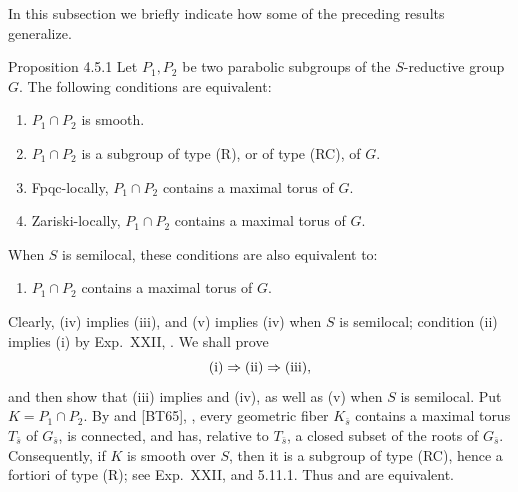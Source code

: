 
In this subsection we briefly indicate how some of the preceding
results generalize.

\begin{sgastatement}{Proposition 4.5.1}
Let \(P_1,P_2\) be two parabolic subgroups of the \(S\)-reductive
group \(G\).  The following conditions are equivalent:
\begin{enumerate}[label=\textup{(\roman*)}]
\item \(P_1\cap P_2\) is smooth.
\item \(P_1\cap P_2\) is a subgroup of type \textup{(R)}, or of type
\textup{(RC)}, of \(G\).
\item Fpqc-locally, \(P_1\cap P_2\) contains a maximal torus of \(G\).
\item Zariski-locally, \(P_1\cap P_2\) contains a maximal torus of
\(G\).
\end{enumerate}
When \(S\) is semilocal, these conditions are also equivalent to:
\begin{enumerate}[label=\textup{(\roman*)},start=5]
\item \(P_1\cap P_2\) contains a maximal torus of \(G\).
\end{enumerate}
\end{sgastatement}

\SGAProof
Clearly, \textup{(iv)} implies \textup{(iii)}, and \textup{(v)}
implies \textup{(iv)} when \(S\) is semilocal; condition \textup{(ii)}
implies \textup{(i)} by Exp.\ XXII, .  We shall prove
\[
 \textup{(i)}\Rightarrow\textup{(ii)}
 \Rightarrow\textup{(iii)},
\]
and then show that \textup{(iii)} implies \textup{} and
\textup{(iv)}, as well as \textup{(v)} when \(S\) is semilocal.
Put \(K=P_1\cap P_2\).  By  and \textup{[BT65]}, , every
geometric fiber \(K_{\bar s}\) contains a maximal torus
\(T_{\bar s}\) of \(G_{\bar s}\), is connected, and has, relative to
\(T_{\bar s}\), a closed subset of the roots of \(G_{\bar s}\).
Consequently, if \(K\) is smooth over \(S\), then it is a subgroup of
type \textup{(RC)}, hence a fortiori of type \textup{(R)}; see Exp.\
XXII,  and 5.11.1.  Thus \textup{} and \textup{} are
equivalent.


